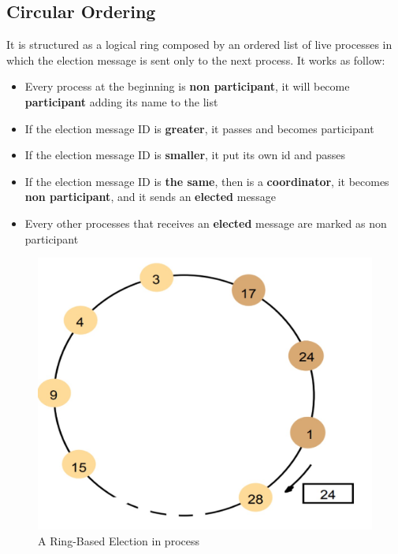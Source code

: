 \subsection{Circular Ordering}
It is structured as a logical ring composed by an ordered list of live processes in which the election message is sent only to the next process. It works as follow:
\begin{itemize}
    \item Every process at the beginning is \textbf{non participant}, it will become \textbf{participant} adding its name to the list
    \item If the election message ID is \textbf{greater}, it passes and becomes participant
    \item If the election message ID is \textbf{smaller}, it put its own id and passes
    \item If the election message ID is \textbf{the same}, then is a \textbf{coordinator}, it becomes \textbf{non participant}, and it sends an \textbf{elected} message
    \item Every other processes that receives an \textbf{elected} message are marked as non participant
\end{itemize}

\begin{figure}[!h]
    \centering
    \includegraphics[width=.5\linewidth]{images/SynchronizationCoordinationDS/ringBasedElection.jpeg}
    \caption{A Ring-Based Election in process}
\end{figure}

